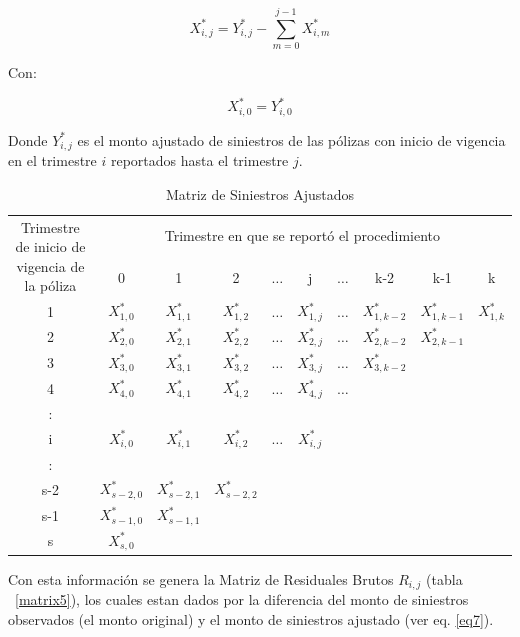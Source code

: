\documentclass[11pt,twoside,openright,spanish]{report}
\numberwithin{equation}{chapter}
\numberwithin{figure}{chapter}
\numberwithin{table}{chapter}
\begin{document}
	\begin{equation}
	{X}_{i,j}^{*}={Y}_{i,j}^{*}-\sum _{m=0}^{j-1}{X}_{i,m}^{*}
	\label{eq6}
	\end{equation}	
	 
	Con:
	
	$${X}_{i,0}^{*}={Y}_{i,0}^{*}$$ 
	
	Donde ${Y}_{i,j}^{*}$ es el monto ajustado de siniestros de las pólizas con inicio de vigencia en el trimestre $i$ reportados hasta el trimestre $j$. 
	
	\begin{table}[ht]
		\centering
		\begin{tabularx}{\linewidth}{ c|ccccccccc}
		\multirow{2}{4cm}{Trimestre de inicio de vigencia de la póliza}&  \multicolumn{9}{c}{Trimestre en que se reportó el procedimiento} \\
			& 0  & 1 & 2 & $ \dots $ & j & $\dots $ & k-2 & k-1 &  k \\
			\midrule
			1      &  $X_{1,0}^{*}$ & $X_{1,1}^{*}$ & $X_{1,2}^{*}$ & $ \dots $ & $X_{1,j}^{*}$ & $ \dots $ & $X_{1,k-2}^{*}$ & $X_{1,k-1}^{*}$ & $X_{1,k}^{*}$ \\
			2      &  $X_{2,0}^{*}$ & $X_{2,1}^{*}$ & $X_{2,2}^{*}$ & $ \dots $ & $X_{2,j}^{*}$ & $ \dots $ & $X_{2,k-2}^{*}$ & $X_{2,k-1}^{*}$ & \\
			3      &  $X_{3,0}^{*}$ & $X_{3,1}^{*}$ & $X_{3,2}^{*}$ & $ \dots $ & $X_{3,j}^{*}$ & $ \dots $ & $X_{3,k-2}^{*}$ & & \\
			4      &  $X_{4,0}^{*}$ & $X_{4,1}^{*}$ & $X_{4,2}^{*}$ & $ \dots $ & $X_{4,j}^{*}$ & $ \dots $ & & & \\
			:      & & & & & & & & &\\
			i      &  $X_{i,0}^{*}$ & $X_{i,1}^{*}$ & $X_{i,2}^{*}$ & $ \dots $ & $X_{i,j}^{*}$ & & & & \\
			:      & & & & & & & & & \\
			s-2      &  $X_{s-2,0}^{*}$ & $X_{s-2,1}^{*}$ & $X_{s-2,2}^{*}$ & & & & & & \\
			s-1      &  $X_{s-1,0}^{*}$ & $X_{s-1,1}^{*}$ & & & & & & & \\
			s      &  $X_{s,0}^{*}$ & & & & & & & & \\
		\end{tabularx}
				\caption{Matriz de Siniestros  Ajustados}
				\label{matrix4}
	\end{table}
		
	Con esta información se genera la Matriz de Residuales Brutos $R_{i,j}^{}$ (tabla ~\ref{matrix5}), los cuales estan dados por la diferencia del monto de siniestros observados (el monto original) y el monto de siniestros ajustado  (ver eq. \ref{eq7}).
		
\end{document}
